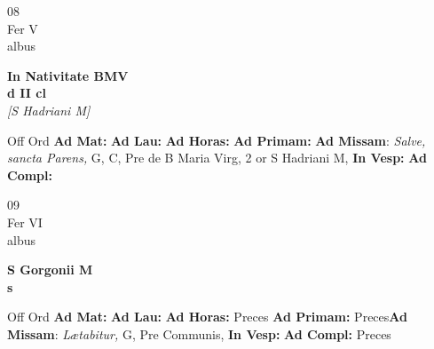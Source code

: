 \documentclass[10pt, openany]{book}
\begin{document}
        \begin{center}
            \begin{minipage}{3.5in}
                \vspace{2em}
                \begin{minipage}{0.5in}
                    {\Huge 08} \\
                    {\normalsize Fer V} \\
                    {\normalsize albus}
                \end{minipage}
                \begin{minipage}{3.0in}
                    \textbf{ \large In Nativitate BMV \\
                    \textnormal{\normalsize d II cl}} \\ \textit{[S Hadriani M]} \\ 
                \end{minipage}
                \begin{justify}Off Ord
                    \textbf{Ad Mat: }
                    \textbf{Ad Lau: }
                    \textbf{Ad Horas: }
                    \textbf{Ad Primam: }\textbf{Ad Missam}: \textit{Salve, sancta Parens,} G, C, Pre de B Maria Virg, 2 or S Hadriani M,  
                    \textbf{In Vesp: }
                    \textbf{Ad Compl: }
                \end{justify}
            \end{minipage}
        \end{center}
    
        \begin{center}
            \begin{minipage}{3.5in}
                \vspace{2em}
                \begin{minipage}{0.5in}
                    {\Huge 09} \\
                    {\normalsize Fer VI} \\
                    {\normalsize albus}
                \end{minipage}
                \begin{minipage}{3.0in}
                    \textbf{ \large S Gorgonii M \\
                    \textnormal{\normalsize s}} \\ 
                \end{minipage}
                \begin{justify}Off Ord
                    \textbf{Ad Mat: }
                    \textbf{Ad Lau: }
                    \textbf{Ad Horas: }Preces
                    \textbf{Ad Primam: }Preces\textbf{Ad Missam}: \textit{Lætabitur,} G, Pre Communis,  
                    \textbf{In Vesp: }
                    \textbf{Ad Compl: }Preces
                \end{justify}
            \end{minipage}
        \end{center}
    
\end{document}

